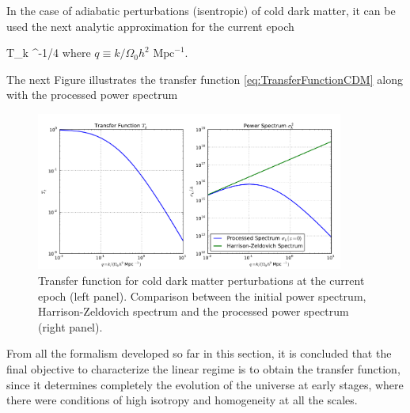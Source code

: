 In the case of adiabatic perturbations (isentropic) of cold dark matter,
it can be used the next analytic approximation for the current epoch
\cite{longair2008}


{ T_k \approx {}
^{-1/4} }
where $q \equiv k/\Omega_0 h^{2} \mbox{ Mpc}^{-1} $.


The next Figure illustrates the transfer function 
\ref{eq:TransferFunctionCDM} along with the processed power spectrum


\begin{figure}[htbp]
	\centering
	\includegraphics[width=0.9\textwidth]
	{./figures/2_theoretical_framework/Transfer_Function.pdf}

	\caption{\small{Transfer function for cold dark matter perturbations at 
	the current	epoch \cite{longair2008} (left panel). Comparison between 
	the initial	power spectrum, Harrison-Zeldovich spectrum and the processed 
	power spectrum (right panel).}}
	
	\label{fig:TransferFunctionCDM}
\end{figure}


From all the formalism developed so far in this section, it is concluded 
that the final objective to characterize the linear regime is to obtain 
the transfer function, since it determines completely the evolution of the
universe at early stages, where there were conditions of high isotropy and 
homogeneity at all the scales.



